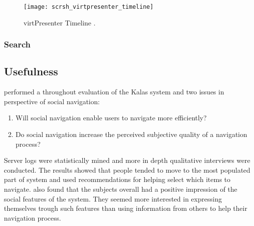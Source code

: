 \begin{figure}
  \centering
  \texttt{[image: scrsh\_virtpresenter\_timeline]}
  \caption[virtPresenter Timeline]{
    virtPresenter Timeline \citep[]{mertens06}.
  }
  \label{figure:scrsh.virtpresenter.timeline}
\end{figure}


\subsubsection{Search}

\subsection{Usefulness}

\citet{svensson05} performed a throughout evaluation of the Kalas system and
two issues in perspective of social navigation:

\begin{enumerate}
  \item Will social navigation enable users to navigate more efficiently?
  \item Do social navigation increase the perceived subjective quality of
    a navigation process?
\end{enumerate}

Server logs were statistically mined and more in depth qualitative interviews
were conducted. The results showed that people tended to move to the most
populated part of system and used recommendations for helping select which
items to navigate. \citeauthor{svensson05} also found that the subjects
overall had a positive impression of the social features of the system. They
seemed more interested in expressing themselves trough such features than
using information from others to help their navigation process.

